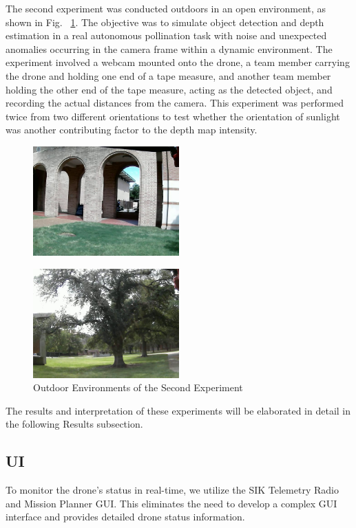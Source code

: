     
The second experiment was conducted outdoors in an open environment, as shown in Fig. ~\ref{fig8.1}. The objective was to simulate object detection and depth estimation in a real autonomous pollination task with noise and unexpected anomalies occurring in the camera frame within a dynamic environment. The experiment involved a webcam mounted onto the drone, a team member carrying the drone and holding one end of a tape measure, and another team member holding the other end of the tape measure, acting as the detected object, and recording the actual distances from the camera. This experiment was performed twice from two different orientations to test whether the orientation of sunlight was another contributing factor to the depth map intensity.


\begin{figure}[H]
    \centerline{\includegraphics[width=0.5\textwidth]{Figures/Methods/env2a.png}}
    \label{fig8.1}
\end{figure}

\begin{figure}[H]
    \centerline{\includegraphics[width=0.5\textwidth]{Figures/Methods/env2b.png}}
    \caption{Outdoor Environments of the Second Experiment}
    \label{fig8.2}
\end{figure}

The results and interpretation of these experiments will be elaborated in detail in the following Results subsection.

\subsection{UI}\label{subsection:E}
To monitor the drone's status in real-time, we utilize the SIK Telemetry Radio and Mission Planner GUI. This eliminates the need to develop a complex GUI interface and provides detailed drone status information.